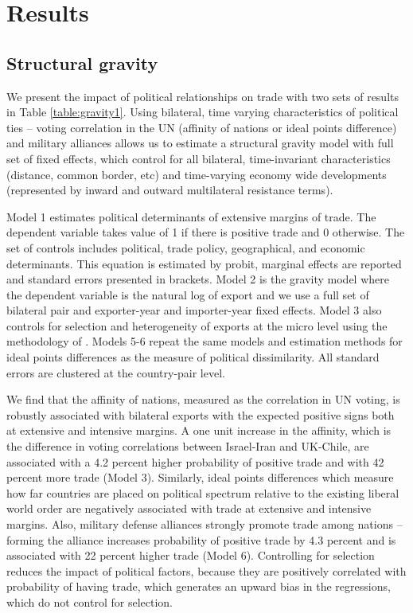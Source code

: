 \section{Results}
\subsection{Structural gravity}
We present the impact of political relationships on trade with two sets of results in Table \ref{table:gravity1}. Using bilateral, time varying characteristics of political ties -- voting correlation in the UN (affinity of nations or ideal points difference) and military alliances allows us to estimate a structural gravity model with full set of fixed effects, which control for all bilateral, time-invariant characteristics (distance, common border, etc) and time-varying economy wide developments (represented by inward and outward multilateral resistance terms).



Model 1 estimates political determinants of extensive margins of trade. The dependent variable takes value of 1 if there is positive trade and 0 otherwise. The set of controls includes political, trade policy, geographical, and economic determinants. This equation is estimated by probit, marginal effects are reported and standard errors presented in brackets.  Model 2 is the gravity model where the dependent variable is the natural log of export and we use a full set of bilateral pair and exporter-year and importer-year fixed effects. Model 3 also controls for selection and heterogeneity of exports at the micro level using the methodology of \cite{helpman2008estimating}. Models 5-6 repeat the same models and estimation methods for ideal points differences as the measure of political dissimilarity. All standard errors are clustered at the country-pair level.

We find that the affinity of nations, measured as the correlation in UN voting,  is robustly associated with bilateral exports with the expected positive signs both at extensive and intensive margins. A one unit increase in the affinity, which is the difference in voting correlations between  Israel-Iran and  UK-Chile, are associated with a 4.2 percent higher probability of positive trade and with 42 percent more trade (Model 3). Similarly, ideal points differences which measure how far countries are placed on political spectrum relative to the existing liberal world order are negatively associated with trade at extensive and intensive margins. Also, military defense alliances strongly promote trade among nations -- forming the alliance increases probability of positive trade by 4.3 percent and is associated with 22 percent higher trade (Model 6). Controlling for selection reduces the impact of political factors, because they are positively correlated with probability of having trade, which generates an upward bias in the regressions, which do not control for selection.

